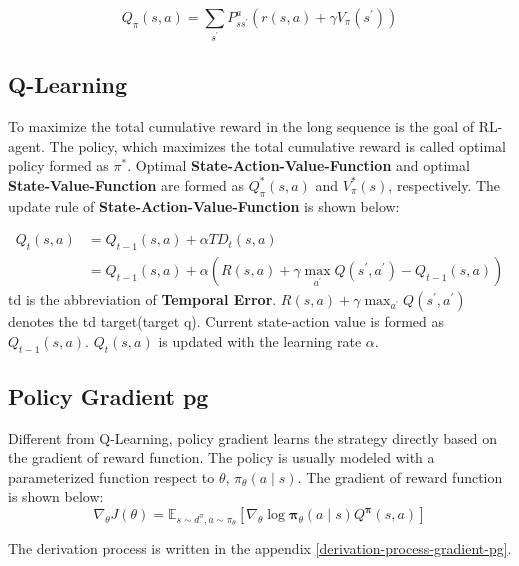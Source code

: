 \begin{equation} \label{equation:bellman-action-value-function}
Q_{\pi}(s, a)=\sum_{s^{\prime}} P_{s s^{\prime}}^{a}\left(r(s, a)+\gamma V_{\pi}\left(s^{\prime}\right)\right)
\end{equation}

\subsection{Q-Learning}
To maximize the total cumulative reward in the long sequence is the goal of RL-agent. The policy, which maximizes the total cumulative reward is called optimal policy formed as $\pi^*$. Optimal \textbf{State-Action-Value-Function} and optimal \textbf{State-Value-Function} are formed as $Q_\pi^*(s, a)$ and $V_\pi^*(s)$, respectively. The update rule of \textbf{State-Action-Value-Function} is shown below:

\begin{equation}
\begin{aligned}
Q_t(s, a) &= Q_{t-1}(s, a) + \alpha TD_t(s, a) \\
					&= Q_{t-1}(s, a)+\alpha\left(R(s, a)+\gamma \max _{a^{\prime}} Q\left(s^{\prime}, a^{\prime}\right)-Q_{t-1}(s, a)\right)
\end{aligned}
\end{equation}
\gls{td} is the abbreviation of \textbf{Temporal Error}. $R(s, a)+\gamma \max _{a^{\prime}} Q\left(s^{\prime}, a^{\prime}\right)$ denotes the \gls{td} target(target q). Current state-action value is formed as $Q_{t-1}(s, a)$. $Q_t(s, a)$ is updated with the learning rate $\alpha$.

\subsection{Policy Gradient \gls{pg}}
Different from Q-Learning, policy gradient learns the strategy directly based on the gradient of reward function. The policy is usually modeled with a parameterized function respect to $\theta$, $\pi_\theta \left(a \mid s\right)$. The gradient of reward function is shown below:
\begin{equation}
\nabla_{\theta} J(\theta)=\mathbb{E}_{s \sim d^{\pi}, a \sim \pi_{\theta}}\left[\nabla_{\theta} \log \boldsymbol{\pi}_{\theta}(a \mid s) Q^{\boldsymbol{\pi}}(s, a)\right]
\end{equation}

The derivation process is written in the appendix \ref{derivation-process-gradient-pg}.

